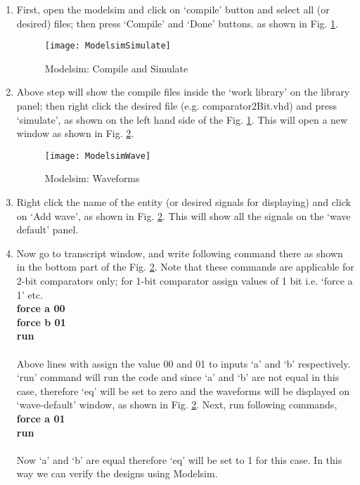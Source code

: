 \begin{enumerate}
	\item First, open the modelsim and click on `compile' button and select all (or desired) files; then press `Compile' and `Done' buttons. as shown in Fig. \ref{fig:Modelsim}.
	
	\begin{figure}[!h]
		\centering
		\texttt{[image: ModelsimSimulate]}
		\caption{Modelsim: Compile and Simulate}
		\label{fig:Modelsim}
	\end{figure}
	
	\item Above step will show the compile files inside the `work library' on the library panel; then right click the desired file (e.g. comparator2Bit.vhd) and press `simulate',  as shown on the left hand side of the Fig. \ref{fig:Modelsim}. This will open a new window as shown in Fig. \ref{fig:ModelsimWave}. 
	
	\begin{figure}[!h]
		\centering
		\texttt{[image: ModelsimWave]}
		\caption{Modelsim: Waveforms}
		\label{fig:ModelsimWave}
	\end{figure}
	
	\item  Right click the name of the entity (or desired signals for displaying) and click on `Add wave', as shown in Fig. \ref{fig:ModelsimWave}. This will show all the signals on the `wave default' panel. 
	
	\item Now go to transcript window, and write following command there as shown in the bottom part of the Fig. \ref{fig:ModelsimWave}. Note that these commands are applicable for 2-bit comparators only; for 1-bit comparator assign values of 1 bit i.e. `force a 1' etc. 
	\\
	\textbf{force a 00}
	\\
	\textbf{force b 01}
	\\
	\textbf{run}
	\\
	\\
	Above lines with assign the value 00 and 01 to inputs `a' and `b' respectively. `run' command will run the code and since `a' and `b' are not equal in this case, therefore `eq' will be set to zero and the waveforms will be displayed on `wave-default' window, as shown in Fig. \ref{fig:ModelsimWave}.  Next, run following commands, 
	\\
	\textbf{force a 01}
	\\
	\textbf{run}
	\\
	\\
	Now `a' and `b' are equal therefore `eq' will be set to 1 for this case. In this way we can verify the designs using Modelsim. 
	
\end{enumerate} 




